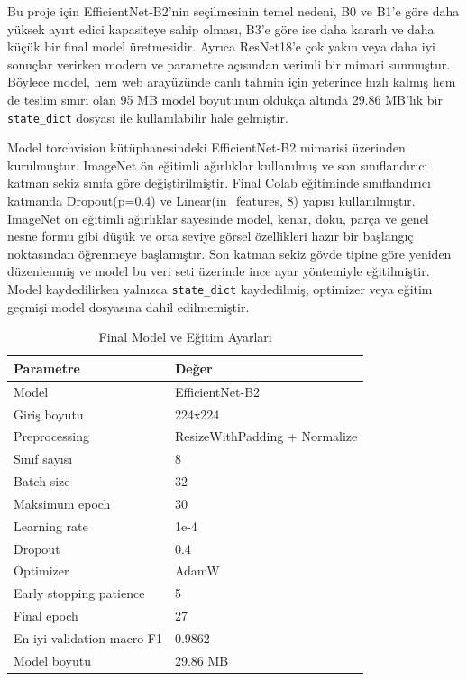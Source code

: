 \documentclass[conference]{IEEEtran}
\begin{document}
Bu proje için EfficientNet-B2'nin seçilmesinin temel nedeni, B0 ve B1'e göre
daha yüksek ayırt edici kapasiteye sahip olması, B3'e göre ise daha kararlı
ve daha küçük bir final model üretmesidir. Ayrıca ResNet18'e çok yakın veya
daha iyi sonuçlar verirken modern ve parametre açısından verimli bir mimari
sunmuştur. Böylece model, hem web arayüzünde canlı tahmin için yeterince
hızlı kalmış hem de teslim sınırı olan 95 MB model boyutunun oldukça altında
29.86 MB'lık bir \texttt{state\_dict} dosyası ile kullanılabilir hale
gelmiştir.
\vspace{0.4cm}

Model torchvision kütüphanesindeki EfficientNet-B2 mimarisi üzerinden
kurulmuştur. ImageNet ön eğitimli ağırlıklar kullanılmış ve son
sınıflandırıcı katman sekiz sınıfa göre değiştirilmiştir. Final Colab
eğitiminde sınıflandırıcı katmanda Dropout(p=0.4) ve Linear(in\_features, 8)
yapısı kullanılmıştır. ImageNet ön eğitimli ağırlıklar sayesinde model,
kenar, doku, parça ve genel nesne formu gibi düşük ve orta seviye görsel
özellikleri hazır bir başlangıç noktasından öğrenmeye başlamıştır. Son
katman sekiz gövde tipine göre yeniden düzenlenmiş ve model bu veri seti
üzerinde ince ayar yöntemiyle eğitilmiştir. Model kaydedilirken yalnızca
\texttt{state\_dict} kaydedilmiş, optimizer veya eğitim geçmişi model
dosyasına dahil edilmemiştir.

\begin{table}[H]
\centering
\caption{Final Model ve Eğitim Ayarları}
\label{tab:model_settings}
\small
\begin{tabular}{|l|l|}
\hline
\textbf{Parametre} & \textbf{Değer} \\
\hline
Model & EfficientNet-B2 \\
Giriş boyutu & 224x224 \\
Preprocessing & ResizeWithPadding + Normalize \\
Sınıf sayısı & 8 \\
Batch size & 32 \\
Maksimum epoch & 30 \\
Learning rate & 1e-4 \\
Dropout & 0.4 \\
Optimizer & AdamW \\
Early stopping patience & 5 \\
Final epoch & 27 \\
En iyi validation macro F1 & 0.9862 \\
Model boyutu & 29.86 MB \\
\hline
\end{tabular}
\end{table}
\end{document}
